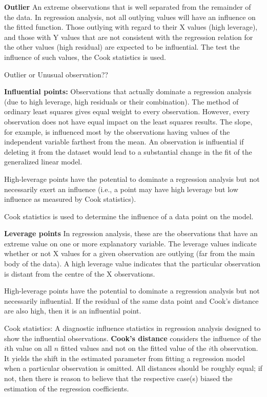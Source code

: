 \textbf{Outlier} An extreme observations that is well separated from the remainder of the data. In regression analysis, not all outlying values will have an influence on the fitted function. Those outlying with regard to their X values (high leverage), and those with Y values that are not consistent with the regression relation for the other values (high residual) are expected to be influential. The test the influence of such values, the Cook statistics is used.

Outlier or Unusual observation??

\textbf{Influential points:} Observations that actually dominate a regression analysis (due to high leverage, high residuals or their combination). The method of ordinary least squares gives equal weight to every observation. However, every observation does not have equal impact on the least squares results. The slope, for example, is influenced most by the observations having values of the independent variable farthest from the mean. An observation is influential if deleting it from the dataset would lead to a substantial change in the fit of the generalized linear model.

High-leverage points have the potential to dominate a regression analysis but not necessarily exert an influence (i.e., a point may have high leverage but low influence as measured by Cook statistics).

Cook statistics is used to determine the influence of a data point on the model.

\textbf{Leverage points} In regression analysis, these are the observations that have an extreme value on one or more explanatory variable. The leverage values indicate whether or not X values for a given observation are outlying (far from the main body of the data). A high leverage value indicates that the particular observation is distant from the centre of the X observations.

High-leverage points have the potential to dominate a regression analysis but not necessarily influential. If the residual of the same data point and Cook's distance are also high, then it is an influential point.




Cook statistics: A diagnostic influence statistics in regression analysis designed to show the influential observations.
\textbf{Cook's distance} considers the influence of the $i$th value on all $n$ fitted values and not on the fitted value of the $i$th observation. It yields the shift in the estimated parameter from fitting a regression model when a particular observation is omitted. All distances should be roughly equal; if not, then there is reason to believe that the respective case(s) biased the estimation of the regression coefficients.

